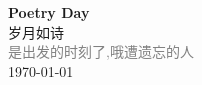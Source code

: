 \vspace*{\fill}
\begin{center}
    \textcolor{orange!50}{\Huge\textbf{Poetry Day}} \\[1em]
    \textcolor{orange!60!pink}{\Large 岁月如诗} \\[2em]
    \textcolor{gray}{\large 是出发的时刻了,哦遭遗忘的人} \\[1em]
    \today
\end{center}
\vspace*{\fill}
\clearpage


\clearpage

\clearpage

\clearpage
